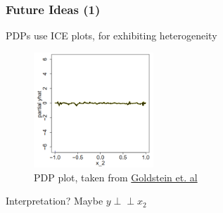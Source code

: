 \documentclass{beamer}
\begin{document}





\begin{frame}
  \frametitle{Future Ideas (1)}
  PDPs use ICE plots, for exhibiting heterogeneity
  \begin{figure}
    \centering
    \includegraphics[width=0.4\textwidth]{figures/pdp}
    \caption{PDP plot, taken from \href{https://arxiv.org/abs/1309.6392}{Goldstein et. al}}
  \end{figure}
  \noindent\makebox[\linewidth]{\rule{\paperwidth}{0.4pt}}
  Interpretation?
  Maybe $y \perp\!\!\!\!\perp x_2$
\end{frame}
\end{document}

